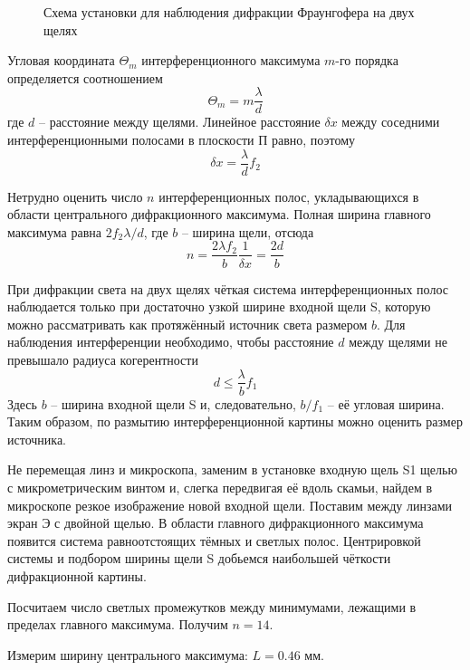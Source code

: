 \documentclass[14pt]{article}
\begin{document}
\begin{figure}[h!]
	\caption{Схема установки для наблюдения дифракции Фраунгофера на двух щелях}
	\label{fig:image}
\end{figure}

Угловая координата $\Theta_m$ интерференционного максимума $m$-го порядка определяется соотношением
$$
	\Theta_m = m\frac{\lambda}{d}
$$
где $d$ -- расстояние между щелями. Линейное расстояние $\delta x$ между соседними интерференционными полосами в плоскости П равно, поэтому
$$
	\delta x = \frac{\lambda}{d}f_2
$$

Нетрудно оценить число $n$ интерференционных полос, укладывающихся в области центрального дифракционного максимума. Полная ширина главного максимума равна $2f_2\lambda/d$, где $b$ -- ширина щели, отсюда
$$
	n = \frac{2\lambda f_2}{b}\frac{1}{\delta x} = \frac{2d}{b}
$$

При дифракции света на двух щелях чёткая система интерференционных полос наблюдается только при достаточно узкой ширине входной щели S, которую можно рассматривать как протяжённый источник света размером $b$. Для наблюдения интерференции необходимо, чтобы расстояние $d$ между щелями не превышало радиуса когерентности
$$
	d \leq \frac{\lambda}{b}f_1
$$
Здесь $b$ -- ширина входной щели S и, следовательно, $b/f_1$ -- её угловая ширина. Таким образом, по размытию интерференционной картины можно оценить размер источника.

Не перемещая линз и микроскопа, заменим в установке входную щель S1 щелью с микрометрическим винтом и, слегка передвигая её вдоль скамьи, найдем в микроскопе резкое изображение новой входной щели. Поставим между линзами экран Э с двойной щелью. В области главного дифракционного максимума появится система равноотстоящих тёмных и светлых полос. Центрировкой системы и подбором ширины щели S добьемся наибольшей чёткости дифракционной картины.

Посчитаем число светлых промежутков между минимумами, лежащими в пределах главного максимума. Получим $n = 14$.

Измерим ширину центрального максимума: $L = 0.46$ мм. %
\end{document}
